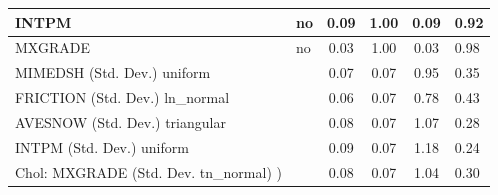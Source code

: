 \begin{table}
\begin{center}
\begin{tabular}{|l|l|c|c|c|l|}
			\hline
			INTPM & no & 0.09 & 1.00 & 0.09 & 0.92 \\
			\hline
			MXGRADE & no & 0.03 & 1.00 & 0.03 & 0.98 \\
			\hline
			MIMEDSH (Std. Dev.) uniform &  & 0.07 & 0.07 & 0.95 & 0.35 \\
			\hline
			FRICTION (Std. Dev.) ln_normal &  & 0.06 & 0.07 & 0.78 & 0.43 \\
			\hline
			AVESNOW (Std. Dev.) triangular &  & 0.08 & 0.07 & 1.07 & 0.28 \\
			\hline
			INTPM (Std. Dev.) uniform &  & 0.09 & 0.07 & 1.18 & 0.24 \\
			\hline
			 Chol: MXGRADE (Std. Dev. tn_normal) ) &  & 0.08 & 0.07 & 1.04 & 0.30 \\
			\hline
		\end{tabular}
	\end{center}
\end{table}